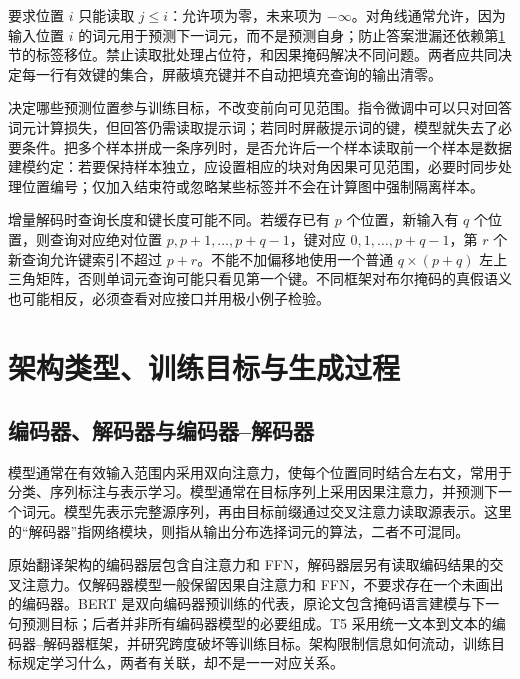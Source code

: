 \documentclass[UTF8,12pt,a4paper,fontset=fandol]{ctexart}
\begin{document}
要求位置 $i$ 只能读取 $j\le i$：允许项为零，未来项为 $-\infty$。对角线通常允许，因为输入位置 $i$ 的词元用于预测下一词元，而不是预测自身；防止答案泄漏还依赖第\ref{sec:tr-training}节的标签移位。禁止读取批处理占位符，和因果掩码解决不同问题。两者应共同决定每一行有效键的集合，屏蔽填充键并不自动把填充查询的输出清零。

决定哪些预测位置参与训练目标，不改变前向可见范围。指令微调中可以只对回答词元计算损失，但回答仍需读取提示词；若同时屏蔽提示词的键，模型就失去了必要条件。把多个样本拼成一条序列时，是否允许后一个样本读取前一个样本是数据建模约定：若要保持样本独立，应设置相应的块对角因果可见范围，必要时同步处理位置编号；仅加入结束符或忽略某些标签并不会在计算图中强制隔离样本。

增量解码时查询长度和键长度可能不同。若缓存已有 $p$ 个位置，新输入有 $q$ 个位置，则查询对应绝对位置 $p,p+1,\ldots,p+q-1$，键对应 $0,1,\ldots,p+q-1$，第 $r$ 个新查询允许键索引不超过 $p+r$。不能不加偏移地使用一个普通 $q\times(p+q)$ 左上三角矩阵，否则单词元查询可能只看见第一个键。不同框架对布尔掩码的真假语义也可能相反，必须查看对应接口并用极小例子检验。

\section{架构类型、训练目标与生成过程}
\label{sec:tr-training}

\subsection{编码器、解码器与编码器--解码器}

模型通常在有效输入范围内采用双向注意力，使每个位置同时结合左右文，常用于分类、序列标注与表示学习。模型通常在目标序列上采用因果注意力，并预测下一个词元。模型先表示完整源序列，再由目标前缀通过交叉注意力读取源表示。这里的“解码器”指网络模块，则指从输出分布选择词元的算法，二者不可混同。

原始翻译架构的编码器层包含自注意力和 FFN，解码器层另有读取编码结果的交叉注意力。仅解码器模型一般保留因果自注意力和 FFN，不要求存在一个未画出的编码器。BERT 是双向编码器预训练的代表，原论文包含掩码语言建模与下一句预测目标\cite{devlin2019}；后者并非所有编码器模型的必要组成。T5 采用统一文本到文本的编码器--解码器框架，并研究跨度破坏等训练目标\cite{raffel2020}。架构限制信息如何流动，训练目标规定学习什么，两者有关联，却不是一一对应关系。
\end{document}

